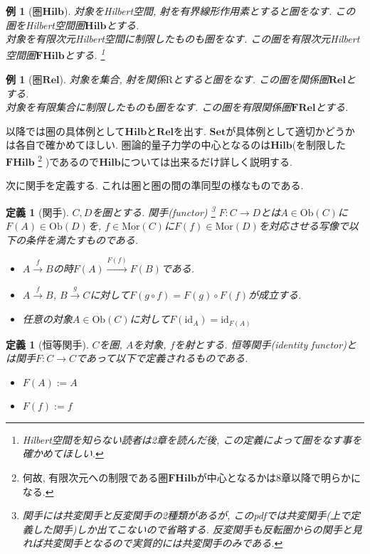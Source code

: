 \documentclass[a4paper,12pt]{ltjsarticle}
\theoremstyle{break}
\newtheorem{defn}[thm]{定義}
\newtheorem{eg}[thm]{例}
\newcommand{\cset}{\mathbf{Set}}
\newcommand{\rel}{\mathbf{Rel}}
\newcommand{\frel}{\mathbf{FRel}}
\newcommand{\hilb}{\mathbf{Hilb}}
\newcommand{\fhilb}{\mathbf{FHilb}}
\newcommand{\mrr}{\mathrm{R}}
\newcommand{\Ob}{\mathrm{Ob}}
\newcommand{\Mor}{\mathrm{Mor}}
\newcommand{\xr}[1]{\xrightarrow{#1}}
\newcommand{\id}{\mathrm{id}}
\numberwithin{equation}{section}
\begin{document}
\begin{eg}[圏$\hilb$]
  対象をHilbert空間, 射を有界線形作用素とすると圏をなす. 
  この圏をHilbert空間圏$\hilb$とする. \\
  対象を有限次元Hilbert空間に制限したものも圏をなす. 
  この圏を有限次元Hilbert空間圏$\fhilb$とする. 
  \footnote{
      Hilbert空間を知らない読者は2章を読んだ後, この定義によって圏をなす事を確かめてほしい.
    }
\end{eg} 

\begin{eg}[圏$\rel$]
  対象を集合, 射を関係$\mrr$とすると圏をなす. 
  この圏を関係圏$\rel$とする. \\
  対象を有限集合に制限したものも圏をなす. 
  この圏を有限関係圏$\frel$とする. 
\end{eg}  

以降では圏の具体例として$\hilb$と$\rel$を出す. 
$\cset$が具体例として適切かどうかは各自で確かめてほしい. 
圏論的量子力学の中心となるのは$\hilb$(を制限した$\fhilb$
\footnote{
    何故, 有限次元への制限である圏$\fhilb$が中心となるかは8章以降で明らかになる.
  }
  )であるので$\hilb$については出来るだけ詳しく説明する. 

次に関手を定義する. 
これは圏と圏の間の準同型の様なものである. 

\begin{defn}[関手]
  $C, D$を圏とする. 
  関手(functor)
  \footnote{
    関手には共変関手と反変関手の2種類があるが, このpdfでは共変関手(上で定義した関手)しか出てこないので省略する. 
    反変関手も反転圏からの関手と見れば共変関手となるので実質的には共変関手のみである.  
  }
  $F: C \to D$とは$A \in \Ob(C)$に$F(A) \in \Ob(D)$を, $f \in \Mor(C)$に$F(f) \in \Mor(D)$を対応させる写像で以下の条件を満たすものである. 
  \begin{itemize}
    \item $A \xr{f} B$の時$F(A) \xr{F(f)} F(B)$である. 
    \item $A \xr{f} B$, $B \xr{g} C$に対して$F(g \circ f) = F(g) \circ F(f)$が成立する.
    \item 任意の対象$A \in \Ob(C)$に対して$F(\id_A) = \id_{F(A)}$
  \end{itemize}
\end{defn}

\begin{defn}[恒等関手]
  $C$を圏, $A$を対象, $f$を射とする. 
  恒等関手(identity functor)とは関手$F :C \to C$であって以下で定義されるものである. 
  \begin{itemize}
    \item $F(A):=A$
    \item $F(f):=f$
  \end{itemize}
\end{defn}
\end{document}
